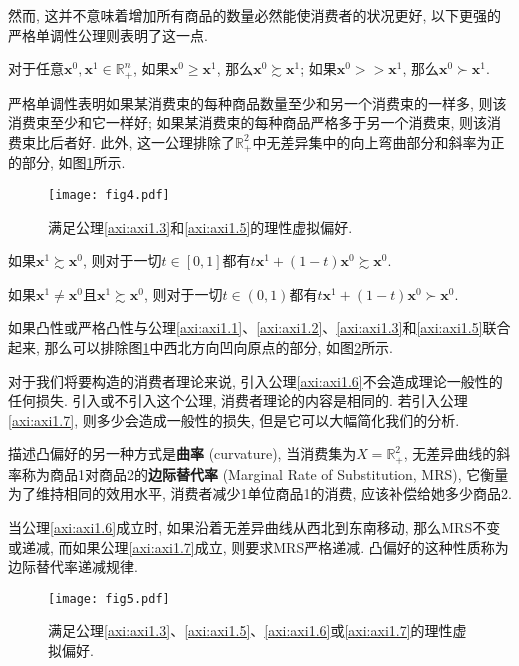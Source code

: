 \documentclass[cn, 12pt, math=mtpro2, bibstyle=apa, blue, twocol]{elegantbook}
\newcommand{\R}{\mathbb{R}}
\newcommand{\x}{\mathbf{x}}
\begin{document}
然而, 这并不意味着增加所有商品的数量必然能使消费者的状况更好, 以下更强的严格单调性公理则表明了这一点.

\begin{axiom}[严格单调性]\label{axi:axi1.5}
对于任意$\x^0,\x^1\in\R^n_+$, 如果$\x^0\ge\x^1$, 那么$\x^0\succsim \x^1$; 如果$\x^0>>\x^1$, 那么$\x^0\succ\x^1$.
\end{axiom}
严格单调性表明如果某消费束的每种商品数量至少和另一个消费束的一样多, 则该消费束至少和它一样好; 如果某消费束的每种商品严格多于另一个消费束, 则该消费束比后者好. 此外, 这一公理排除了$\R^2_+$中无差异集中的向上弯曲部分和斜率为正的部分, 如图\ref{fig1.4}所示.

\begin{figure}
  \centering
  \texttt{[image: fig4.pdf]}
  \caption{满足公理\ref{axi:axi1.3}和\ref{axi:axi1.5}的理性虚拟偏好.}\label{fig1.4}
\end{figure}

\begin{axiom}[凸性]\label{axi:axi1.6}
如果$\x^1\succsim\x^0$, 则对于一切$t\in[0,1]$都有$t\x^1+(1-t)\x^0\succsim\x^0$.
\end{axiom}
\begin{axiom}[严格凸性]\label{axi:axi1.7}
如果$\x^1\ne\x^0$且$\x^1\succsim\x^0$, 则对于一切$t\in(0,1)$都有$t\x^1+(1-t)\x^0\succ\x^0$.
\end{axiom}

如果凸性或严格凸性与公理\ref{axi:axi1.1}、\ref{axi:axi1.2}、\ref{axi:axi1.3}和\ref{axi:axi1.5}联合起来, 那么可以排除图\ref{fig1.4}中西北方向凹向原点的部分, 如图\ref{fig1.5}所示.

对于我们将要构造的消费者理论来说, 引入公理\ref{axi:axi1.6}不会造成理论一般性的任何损失. 引入或不引入这个公理, 消费者理论的内容是相同的. 若引入公理\ref{axi:axi1.7}, 则多少会造成一般性的损失, 但是它可以大幅简化我们的分析.

描述凸偏好的另一种方式是\textbf{曲率} (curvature), 当消费集为$X=\R^2_+$, 无差异曲线的斜率称为商品1对商品2的\textbf{边际替代率} (Marginal Rate of Substitution, MRS), 它衡量为了维持相同的效用水平, 消费者减少1单位商品1的消费, 应该补偿给她多少商品2.

当公理\ref{axi:axi1.6}成立时, 如果沿着无差异曲线从西北到东南移动, 那么MRS不变或递减, 而如果公理\ref{axi:axi1.7}成立, 则要求MRS严格递减. 凸偏好的这种性质称为边际替代率递减规律.
\begin{figure}
  \centering
  \texttt{[image: fig5.pdf]}
  \caption{满足公理\ref{axi:axi1.3}、\ref{axi:axi1.5}、\ref{axi:axi1.6}或\ref{axi:axi1.7}的理性虚拟偏好.}\label{fig1.5}
\end{figure}
\end{document}
